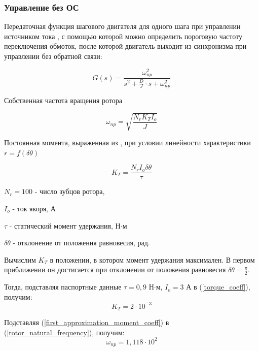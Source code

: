 \subsubsection{ Управление без ОС }

Передаточная функция шагового двигателя для одного шага при управлении источником тока \cite[гл. 4.2, ф-ла 4.65]{Kenio}, с помощью которой можно определить пороговую частоту переключения обмоток, после которой двигатель выходит из синхронизма при управлении без обратной связи:

\begin{equation}
    \label{step_motor_transfer_function}
    G(s) = \frac{ \omega_{np}^{2} }
                { s^{2} + \frac{D}{J} \cdot s + \omega_{np}^{2} }
\end{equation}

Собственная частота вращения ротора \cite[гл. 4.2, ф-ла 4.48]{Kenio}

\begin{equation}
    \label{rotor_natural_frequency}
    \omega_{np} = \sqrt{\frac{N_{r}K_{T}I_{o}}{J}}
\end{equation}

Постоянная момента, выраженная из \cite[гл. 4.2, ф-ла 4.52]{Kenio}, при условии линейности характеристики $r = f(\delta\theta)$

\begin{equation}
    \label{torque_coeff}
    K_{T} = \frac{N_{r}I_{o}\delta\theta}{\tau}
\end{equation}

$N_{r} = 100$ - число зубцов ротора,

$I_{o}$ - ток якоря, А

$\tau$ - статический момент удержания, Н$\cdot$м

$\delta\theta$ - отклонение от положения равновесия, рад.
\newline
\newline

Вычислим $K_{T}$ в положении, в котором момент удержания максимален.
В первом приближении он достигается при отклонении от положения равновесия
$\delta\theta = \frac{\pi}{2}$.

Тогда, подставляя паспортные данные $\tau = 0,9$ Н$\cdot$м, $I_{o} = 3$
А в (\ref{torque_coeff}), получим:
\begin{equation}
    \label{first_approximation_moment_coeff}
    K_{T} = 2\cdot10^{-3}
\end{equation}

Подставляя (\ref{first_approximation_moment_coeff}) в (\ref{rotor_natural_frequency}), получим:
\begin{equation}
    \label{first_approximation_rotor_natural_frequency}
    \omega_{np} = 1,118 \cdot 10^{2}
\end{equation}

